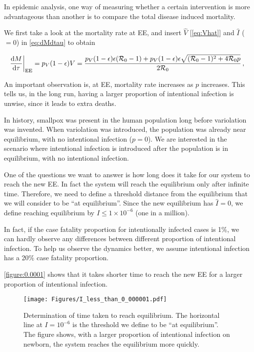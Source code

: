 \documentclass[12pt]{article}
\newcommand\dbyd[2]{\frac{\mathrm d{#1}}{\mathrm d{#2}}}
\newcommand{\R}{\mathcal{R}}
\newcommand{\pmV}{p_{V}}
\begin{document}
In epidemic analysis, one way of measuring whether a certain intervention is more advantageous than another is to compare the total disease induced mortality. 

We first take a look at the mortality rate at EE, and insert $\hat{V}$ [\autoref{eq:Vhat}]
and $\hat{I}$ ($=0$) in \autoref{eq:dMdtau} to obtain
\begin{linenomath*}
\begin{equation}
\left. \dbyd{M}{\tau}\right|_{\rm EE}=\pmV(1-\epsilon)V=\frac{\pmV(1-\epsilon)\epsilon(\R_0 -1)+ \pmV(1-\epsilon)\epsilon \sqrt{(\R_0-1)^2+4\R_0 p}}{2\R_0}\,, \label{eq:dMdt}
\end{equation}
\end{linenomath*}

An important observation is, at EE, mortality rate increases as $p$ increases. This tells us, in the long run, having a larger proportion of intentional infection is unwise, since it leads to extra deaths.

In history, smallpox was present in the human population long before variolation was invented. When variolation was introduced, the population was already near equilibrium, with no intentional infection ($p=0$). We are interested in the scenario where intentional infection is introduced after the population is in equilibrium, with no intentional infection.

One of the questions we want to answer is how long does it take for our system to reach the new EE. In fact the system will reach the equilibrium only after infinite time.  Therefore, we need to define a threshold distance from the equilibrium that we will consider to be ``at equilibrium''.
Since the new equilibrium has $\hat{I}=0$, we define reaching equilibrium by $I\leq 1\times 10^{-6}$ (one in a million).

In fact, if the case fatality proportion for intentionally infected cases is 1\%, we can hardly observe any differences between different proportion of intentional infection. To help us observe the dynamics better, we assume intentional infection has a 20\% case fatality proportion.

\autoref{figure:0.0001} shows that it takes shorter time to reach the new EE for a larger proportion of intentional infection.
\begin{figure}[h]
  \centering
  \texttt{[image: Figures/I\_less\_than\_0\_000001.pdf]}
  \caption{Determination of time taken to reach equilibrium.  The horizontal line at $I=10^{-6}$ is the threshold we define to be ``at equilibrium''. The figure shows, with a larger proportion of intentional infection on newborn, the system reaches the equilibrium more quickly.}
\label{figure:0.0001}
\end{figure}
\end{document}
